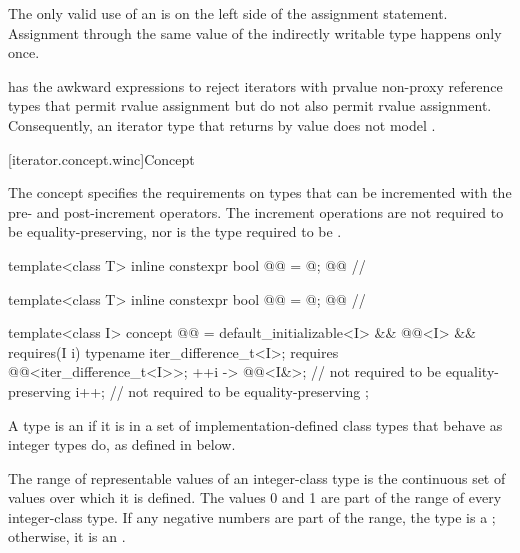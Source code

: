 \pnum
\begin{note}
The only valid use of an  is on the left side of the assignment statement.
Assignment through the same value of the indirectly writable type happens only once.
\end{note}

\pnum
\begin{note}
 has the awkward  expressions to reject
iterators with prvalue non-proxy reference types that permit rvalue
assignment but do not also permit  rvalue assignment.
Consequently, an iterator type  that returns 
by value does not model .
\end{note}

[iterator.concept.winc]{Concept }

\pnum
The  concept specifies the requirements on
types that can be incremented with the pre- and post-increment operators.
The increment operations are not required to be equality-preserving,
nor is the type required to be .

\begin{codeblock}
template<class T>
  inline constexpr bool @@ = @\seebelow@; @\itcorr[-2]@           // \expos

template<class T>
  inline constexpr bool @@ = @\seebelow@; @\itcorr[-2]@    // \expos

template<class I>
  concept @@ =
    default_initializable<I> && @@<I> &&
    requires(I i) {
      typename iter_difference_t<I>;
      requires @@<iter_difference_t<I>>;
      { ++i } -> @@<I&>;   // not required to be equality-preserving
      i++;                      // not required to be equality-preserving
    };
\end{codeblock}

\pnum
A type  is an 
if it is in a set of implementation-defined class types
that behave as integer types do, as defined in below.

\pnum
The range of representable values of an integer-class type
is the continuous set of values over which it is defined.
The values 0 and 1 are part of the range of every integer-class type.
If any negative numbers are part of the range,
the type is a ;
otherwise, it is an .


